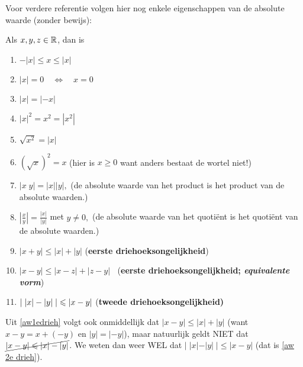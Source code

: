 \documentclass[numbers,wordchoicegiven]{ximera}
\begin{document}
Voor verdere referentie volgen hier nog enkele eigenschappen van de absolute waarde
(zonder bewijs):
\begin{proposition}\label{eig: aw}
	Als $x,y,z\in \R$, dan is
	\begin{enumerate}
		\item \label{aw tss}$-|x| \leqslant x \leqslant |x|$ 
		\item \label{aw 0}$|x|=0 \quad\Leftrightarrow \quad x=0$ 
		\item\label{aw x -x} $|x|=|-x|$
		\item \label{aw kwadr}$|x|^2=x^2=|x^2|$
		\item \label{wortel	kwadr}$\sqrt{x^2}=|x|$
		\item \label{kwadr wortel}$(\sqrt{x})^2=x$ \hfill(hier is $x \geqslant 0$
			want anders bestaat de wortel niet!)
		\item \label{aw product}$|x\;y|=|x||y|,$ \hfill(de absolute waarde van het
			product is het product van de absolute waarden.)
		\item \label{aw	quotient}$\displaystyle \left|\frac{x}{y}\right|=\frac{|x|}{|y|}$
		met $y\neq 0,$ \hfill(de absolute waarde van het quoti\"ent is
			het quoti\"ent van de absolute waarden.)
			
		\item \label{aw1edrieh}$|x+y| \leqslant|x|+|y|$ \hfill ({\bf eerste
			drie\-hoeks\-on\-ge\-lijk\-heid})
		\item \label{aw1e drieh2}$|x-y|
		\leqslant|x-z|+|z-y|\;\;$ \hfill ({\bf eerste
			drie\-hoeks\-on\-ge\-lijk\-heid;  \textit{equivalente vorm}})
		\item \label{aw 2e drieh} $\ds |\;|x|-|y|\;| \leqslant|x-y|$ \hfill
		(\bf tweede driehoeksongelijkheid)
	\end{enumerate}
\end{proposition}

\begin{remark}
Uit \ref{aw1edrieh} volgt ook onmiddellijk dat $|x-y| \leq |x|+|y|$ (want $x-y=x+(-y)$ en $|y|=|-y|$), maar natuurlijk geldt NIET dat $\cancel{|x-y| \leq |x| - |y|}$. We weten dan weer WEL dat $|\;|x|-|y|\;|\leq|x-y|$ (dat is \ref{aw 2e drieh}).
\end{remark}
\end{document}
